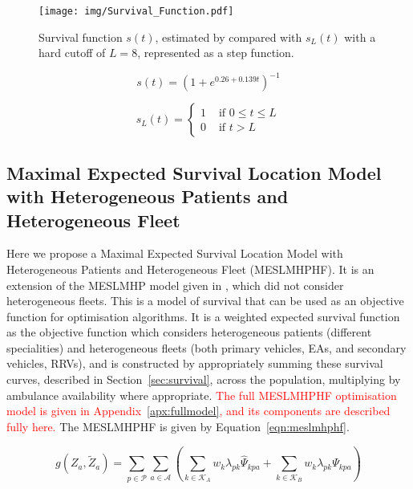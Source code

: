 \documentclass[numbers,webpdf,imaman]{ima-authoring-template}%
\begin{document}
\begin{figure}
\centering
\texttt{[image: img/Survival\_Function.pdf]}
\caption{Survival function $s(t)$, estimated by \citet{Valenzuela20001206}
compared with $s_L(t)$ with a hard cutoff of $L=8$, represented as a step
function.}
\label{fig:survivalfunction}
\end{figure}

\begin{equation}\label{eqn:survival_curve}
    s(t) = \left(1 + e^{0.26+0.139t}\right)^{-1}
\end{equation}

\begin{equation}\label{eqn:survival_cutoff}
    s_L(t) = \begin{cases}
    1 & \text{ if } 0\leq t \leq L \\
    0 & \text{ if } t > L 
    \end{cases}
\end{equation}


\subsection{Maximal Expected Survival Location Model with Heterogeneous
            Patients and Heterogeneous Fleet}\label{sec:meslmhphf}
Here we propose a Maximal Expected Survival Location Model with Heterogeneous
Patients and Heterogeneous Fleet (MESLMHPHF). It is an extension of the
MESLMHP model given in \citet{Knight2012918}, which did not consider
heterogeneous fleets. This is a model of survival that can be used as an
objective function for optimisation algorithms. It is a weighted expected
survival function as the objective function which considers heterogeneous
patients (different specialities) and heterogeneous fleets (both primary
vehicles, EAs, and secondary vehicles, RRVs), and is constructed by
appropriately summing these survival curves, described in
Section~\ref{sec:survival}, across the population, multiplying by ambulance
availability where appropriate.
\textcolor{red}{The full MESLMHPHF optimisation model is given in
Appendix~\ref{apx:fullmodel}, and its components are described fully here.}
The MESLMHPHF is given by Equation~\ref{eqn:meslmhphf}.

\begin{equation}\label{eqn:meslmhphf}
g\left(Z_a, \tilde{Z}_a\right) =
\sum_{p \in \mathcal{P}} \sum_{a \in \mathcal{A}}
\left( \sum_{k \in \mathcal{K}_A}  w_k \lambda_{pk} \hat{\Psi}_{kpa} +
\sum_{k \in \mathcal{K}_B}  w_k \lambda_{pk} \Psi_{kpa} \right)
\end{equation}
\end{document}
